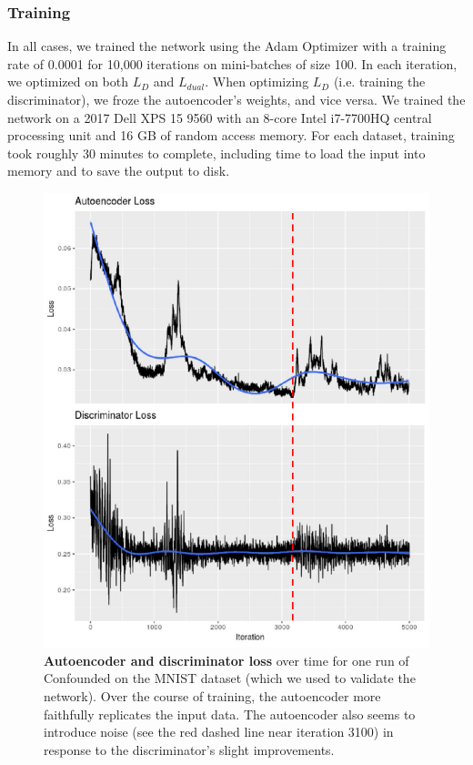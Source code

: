 \documentclass[11pt]{article}
\begin{document}
\subsubsection{Training}

In all cases, we trained the network using the Adam Optimizer \citep{kingma_adam_2014} with a training rate of 0.0001 for 10,000 iterations on mini-batches of size 100.
In each iteration, we optimized on both $L_D$ and $L_{dual}$.
When optimizing $L_D$ (i.e. training the discriminator), we froze the autoencoder's weights, and vice versa.
We trained the network on a 2017 Dell XPS 15 9560 with an 8-core Intel i7-7700HQ central processing unit and 16 GB of random access memory.
For each dataset, training took roughly 30 minutes to complete, including time to load the input into memory and to save the output to disk.

\begin{figure}
	\centering
	\includegraphics[width=\columnwidth]{figures/final/training_loss.pdf}
	\caption[Autoencoder and discriminator loss]{\textbf{Autoencoder and discriminator loss} over time for one run of Confounded on the MNIST dataset (which we used to validate the network).
	Over the course of training, the autoencoder more faithfully replicates the input data.
	The autoencoder also seems to introduce noise (see the red dashed line near iteration 3100) in response to the discriminator's slight improvements.}
	\label{fig:training_loss}
\end{figure}
\end{document}
